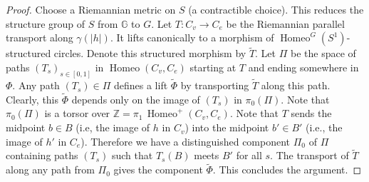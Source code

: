 \documentclass[english,11pt,leqno]{article}
\def\GG{\mathbb{G}}
\def\ZZ{\mathbb{Z}}
\def\on{\operatorname}
\def\Homeo{{ \on{Homeo}}}
\theoremstyle{definition}
\theoremstyle{remark}
\numberwithin{equation}{section}
\begin{document}
\begin{proof}
	Choose a Riemannian metric on $S$ (a contractible choice). This reduces the structure group
	of $S$ from $\GG$ to $G$. Let $T: C_v\to C_e$ be the Riemannian parallel transport along
	$\gamma(|h|)$.  It lifts canonically to a morphism of $\Homeo^G(S^1)$-structured circles.
	Denote this structured morphism by $\widetilde T$.  Let $\Pi$ be the space of paths
	$(T_s)_{s\in[0,1]}$ in $\Homeo(C_v, C_e)$ starting at $T$ and ending somewhere in $\Phi$.
	Any path $(T_s)\in\Pi$ defines a lift $\widetilde\Phi$ by transporting $\widetilde T$ along
	this path. Clearly, this $\widetilde \Phi$ depends only on the image of $(T_s)$ in
	$\pi_0(\Pi)$.  Note that $\pi_0(\Pi)$ is a torsor over $\ZZ = \pi_1 \,\Homeo^+(C_v, C_e)$.
	Note that $T$ sends the midpoint $b\in B$ (i.e, the image of $h$ in $C_v$) into the midpoint
	$b'\in B'$ (i.e., the image of $h'$ in $C_e$). Therefore we have a distinguished component
	$\Pi_0$ of $\Pi$ containing paths $(T_s)$ such that $T_s(B)$ meets $B'$ for all $s$. The
	transport of $\widetilde T$ along any path from $\Pi_0$ gives the component
	$\widetilde\Phi$. This concludes the argument. 
\end{proof}
	
		
 
\end{document}
